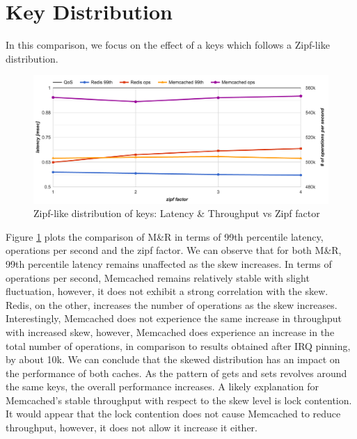 \section{Key Distribution}
In this comparison, we focus on the effect of a keys which follows a Zipf-like distribution.

\begin{figure}[h]
    \includegraphics[width=\textwidth]{./res2/mr_zipf.png}
    \caption{Zipf-like distribution of keys: Latency \& Throughput vs Zipf factor}
    \label{fig:mr_zipf}
\end{figure}

Figure \ref{fig:mr_zipf} plots the comparison of M\&R in terms of 99th percentile latency, operations per second and the zipf factor. We can observe that for both M\&R, 99th percentile latency remains unaffected as the skew increases. In terms of operations per second, Memcached remains relatively stable with slight fluctuation, however, it does not exhibit a strong correlation with the skew. Redis, on the other, increases the number of operations as the skew increases. Interestingly, Memcached does not experience the same increase in throughput with increased skew, however, Memcached does experience an increase in the total number of operations, in comparison to results obtained after IRQ pinning, by about 10k. We can conclude that the skewed distribution has an impact on the performance of both caches. As the pattern of gets and sets revolves around the same keys, the overall performance increases. A likely explanation for Memcached's stable throughput with respect to the skew level is lock contention. It would appear that the lock contention does not cause Memcached to reduce throughput, however, it does not allow it increase it either.